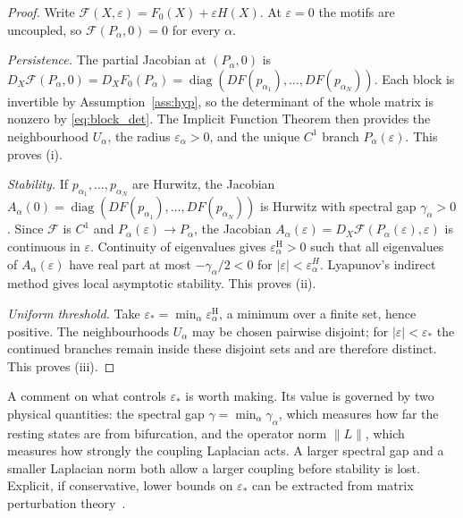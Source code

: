 \documentclass[11pt]{article}
\begin{document}
\begin{proof}
  Write $\mathcal{F}(X,\varepsilon) = F_0(X) + \varepsilon H(X)$. At
  $\varepsilon = 0$ the motifs are uncoupled, so
  $\mathcal{F}(P_\alpha,0) = 0$ for every $\alpha$.

  \emph{Persistence.} The partial Jacobian at $(P_\alpha,0)$ is
  $D_X\mathcal{F}(P_\alpha,0) = D_XF_0(P_\alpha) = \operatorname{diag}
  (DF(p_{\alpha_1}),\ldots,DF(p_{\alpha_N}))$. Each block is invertible
  by Assumption~\ref{ass:hyp}, so the determinant of the whole matrix
  is nonzero by \eqref{eq:block_det}. The Implicit Function Theorem
  then provides the neighbourhood $U_\alpha$, the radius
  $\varepsilon_\alpha > 0$, and the unique $C^1$ branch
  $P_\alpha(\varepsilon)$. This proves (i).

  \emph{Stability.} If $p_{\alpha_1},\ldots,p_{\alpha_N}$ are Hurwitz,
  the Jacobian $A_\alpha(0) = \operatorname{diag}(DF(p_{\alpha_1}),
  \ldots,DF(p_{\alpha_N}))$ is Hurwitz with spectral gap
  $\gamma_\alpha > 0$. Since $\mathcal{F}$ is $C^1$ and
  $P_\alpha(\varepsilon) \to P_\alpha$, the Jacobian
  $A_\alpha(\varepsilon) = D_X\mathcal{F}(P_\alpha(\varepsilon),
  \varepsilon)$ is continuous in $\varepsilon$. Continuity of
  eigenvalues gives $\varepsilon_\alpha^{\mathrm{H}} > 0$ such that all
  eigenvalues of $A_\alpha(\varepsilon)$ have real part at most
  $-\gamma_\alpha/2 < 0$ for $|\varepsilon| < \varepsilon_\alpha^H$.
  Lyapunov's indirect method gives local asymptotic stability. This
  proves (ii).

  \emph{Uniform threshold.} Take $\varepsilon_* = \min_\alpha
  \varepsilon_\alpha^{\mathrm{H}}$, a minimum over a finite set, hence
  positive. The neighbourhoods $U_\alpha$ may be chosen pairwise
  disjoint; for $|\varepsilon| < \varepsilon_*$ the continued branches
  remain inside these disjoint sets and are therefore distinct. This
  proves (iii).
\end{proof}

A comment on what controls $\varepsilon_*$ is worth making. Its value
is governed by two physical quantities: the spectral gap $\gamma =
\min_\alpha\gamma_\alpha$, which measures how far the resting states are
from bifurcation, and the operator norm $\|L\|$, which measures how
strongly the coupling Laplacian acts. A larger spectral gap and a
smaller Laplacian norm both allow a larger coupling before stability is
lost. Explicit, if conservative, lower bounds on $\varepsilon_*$ can be
extracted from matrix perturbation theory~\cite{horn2013}.
\end{document}
